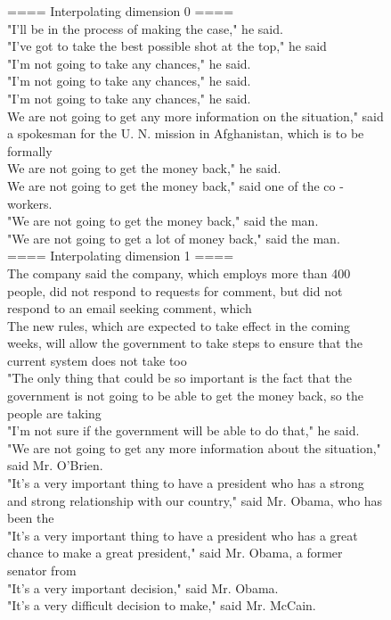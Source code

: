 \documentclass{article} \usepackage{iclr2019_conference,times}
\begin{document}
\begin{figure}[h!]
\centering
\begin{tcolorbox}

\small
==== Interpolating dimension 0 ====\\
\textup{"I'll be in the process of making the case," he said.}\\
\textup{"I've got to take the best possible shot at the top," he said}\\
\textup{"I'm not going to take any chances," he said.}\\
\textup{"I'm not going to take any chances," he said.}\\
\textup{"I'm not going to take any chances," he said.}\\
\textup{We are not going to get any more information on the situation," said a spokesman for the U. N. mission in Afghanistan, which is to be formally}\\
\textup{We are not going to get the money back," he said.}\\
\textup{ We are not going to get the money back," said one of the co - workers.}\\
\textup{"We are not going to get the money back," said the man.}\\
\textup{"We are not going to get a lot of money back," said the man.}\\

==== Interpolating dimension 1 ====\\
\textup{The company said the company, which employs more than 400 people, did not respond to requests for comment, but did not respond to an email seeking comment, which}\\
\textup{The new rules, which are expected to take effect in the coming weeks, will allow the government to take steps to ensure that the current system does not take too}\\
\textup{"The only thing that could be so important is the fact that the government is not going to be able to get the money back, so the people are taking}\\
\textup{"I'm not sure if the government will be able to do that," he said.}\\
\textup{"We are not going to get any more information about the situation," said Mr. O'Brien.}\\
\textup{"It's a very important thing to have a president who has a strong and strong relationship with our country," said Mr. Obama, who has been the}\\
\textup{"It's a very important thing to have a president who has a great chance to make a great president," said Mr. Obama, a former senator from}\\
\textup{"It's a very important decision," said Mr. Obama.}\\
\textup{"It's a very difficult decision to make," said Mr. McCain.}\\


\end{tcolorbox}
\end{figure}
\end{document}
